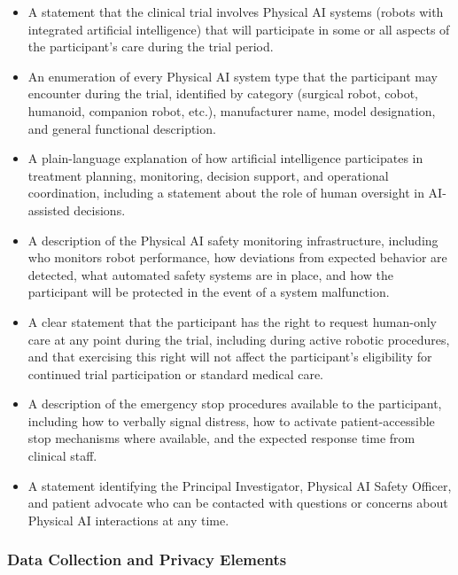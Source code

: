 \begin{itemize}
    \item A statement that the clinical trial involves Physical AI systems
    (robots with integrated artificial intelligence) that will participate in
    some or all aspects of the participant's care during the trial period.

    \item An enumeration of every Physical AI system type that the participant
    may encounter during the trial, identified by category (surgical robot,
    cobot, humanoid, companion robot, etc.), manufacturer name, model
    designation, and general functional description.

    \item A plain-language explanation of how artificial intelligence
    participates in treatment planning, monitoring, decision support, and
    operational coordination, including a statement about the role of human
    oversight in AI-assisted decisions.

    \item A description of the Physical AI safety monitoring infrastructure,
    including who monitors robot performance, how deviations from expected
    behavior are detected, what automated safety systems are in place, and
    how the participant will be protected in the event of a system malfunction.

    \item A clear statement that the participant has the right to request
    human-only care at any point during the trial, including during active
    robotic procedures, and that exercising this right will not affect the
    participant's eligibility for continued trial participation or standard
    medical care.

    \item A description of the emergency stop procedures available to the
    participant, including how to verbally signal distress, how to activate
    patient-accessible stop mechanisms where available, and the expected
    response time from clinical staff.

    \item A statement identifying the Principal Investigator, Physical AI
    Safety Officer, and patient advocate who can be contacted with questions
    or concerns about Physical AI interactions at any time.
\end{itemize}

\subsubsection{Data Collection and Privacy Elements}

